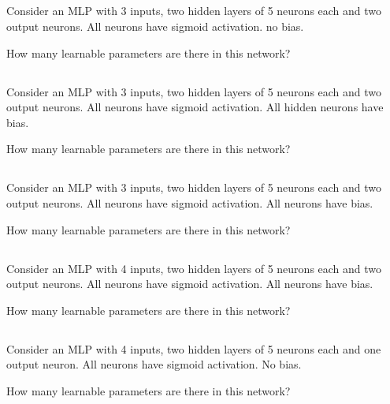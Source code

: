 \begin{frame}
\section{}
Consider an MLP with 3 inputs, two hidden layers of 5 neurons each and two output neurons. All neurons have sigmoid activation. no bias.

How many learnable parameters are there in this network?

\end{frame}

\begin{frame}
\section{}
Consider an MLP with 3 inputs, two hidden layers of 5 neurons each and two output neurons. All neurons have sigmoid activation. All hidden neurons have bias.

How many learnable parameters are there in this network?


\end{frame}

\begin{frame}
\section{}
Consider an MLP with 3 inputs, two hidden layers of 5 neurons each and two output neurons. All neurons have sigmoid activation. All neurons have bias.

How many learnable parameters are there in this network?


\end{frame}

\begin{frame}
\section{}
Consider an MLP with 4 inputs, two hidden layers of 5 neurons each and two output neurons. All neurons have sigmoid activation. All neurons have bias.

How many learnable parameters are there in this network?

\end{frame}

\begin{frame}
\section{}
Consider an MLP with 4 inputs, two hidden layers of 5 neurons each and one output neuron. All neurons have sigmoid activation. No bias.

How many learnable parameters are there in this network?
\end{frame}
